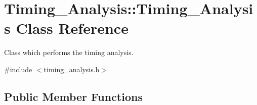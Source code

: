 \hypertarget{classTiming__Analysis_1_1Timing__Analysis}{\section{Timing\-\_\-\-Analysis\-:\-:Timing\-\_\-\-Analysis Class Reference}
\label{classTiming__Analysis_1_1Timing__Analysis}
}


Class which performs the timing analysis.  




{\ttfamily \#include $<$timing\-\_\-analysis.\-h$>$}

\subsection*{Public Member Functions}
